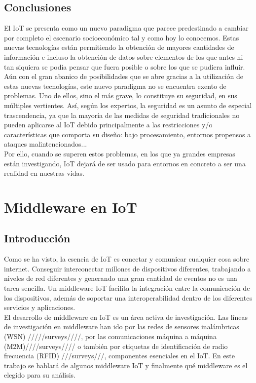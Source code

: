 \documentclass[12pt, twoside]{book}
\begin{document}
\section{Conclusiones}
El IoT se presenta como un nuevo paradigma que parece predestinado a cambiar por completo el escenario socioeconómico tal y como hoy lo conocemos. Estas nuevas tecnologías están permitiendo la obtención de mayores cantidades de información e incluso la obtención de datos sobre elementos de los que antes ni tan siquiera se podía pensar que fuera posible o sobre los que se pudiera influir.\\
Aún con el gran abanico de posibilidades que se abre gracias a la utilización de estas nuevas tecnologías, este nuevo paradigma no se encuentra exento de problemas. Uno de ellos, sino el más
grave, lo constituye su seguridad, en sus múltiples vertientes. Así, según los expertos, la seguridad es un asunto de especial trascendencia, ya que la mayoría de las medidas de seguridad tradicionales no pueden aplicarse al IoT debido principalmente a las restricciones y/o características que comporta su diseño: bajo procesamiento, entornos propensos a ataques malintencionados...\\
Por ello, cuando se superen estos problemas, en los que ya grandes empresas están investigando, IoT dejará de ser usado para entornos en concreto a ser una realidad en nuestras vidas.
\chapter{Middleware en IoT}
\section{Introducción}
Como se ha visto, la esencia de IoT es conectar y comunicar cualquier cosa sobre internet. Conseguir interconectar millones de dispositivos diferentes, trabajando a niveles de red diferentes y generando una gran cantidad de eventos no es una tarea sencilla. Un middleware IoT facilita la integración entre la comunicación de los dispositivos, además de soportar una interoperabilidad dentro de los diferentes servicios y aplicaciones.\\El desarrollo de middleware en IoT es un área activa de investigación. Las líneas de investigación en middleware han ido por las redes de sensores inalámbricas (WSN) /////surveys////, por las comunicaciones máquina a máquina (M2M)////surveys//// o también por etiquetas de identificación de radio frecuencia (RFID) ///surveys///, componentes esenciales en el IoT. En este trabajo se hablará de algunos middleware IoT y finalmente qué middleware es el elegido para su análisis.
\end{document}
